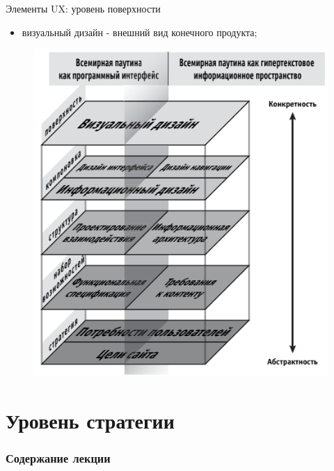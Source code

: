 \documentclass{beamer}
\begin{document}
\begin{frame}{Элементы UX: уровень поверхности}
\begin{itemize}
\item визуальный дизайн - внешний вид конечного продукта;
\end{itemize}
\begin{figure}[h]
\centering
\includegraphics[scale=0.4]{images/lec01-pic12.png}
\end{figure}
\end{frame}

\section{Уровень стратегии}
\begin{frame}
  \frametitle{Содержание лекции}
  \tableofcontents[current]
\end{frame}
\end{document}
